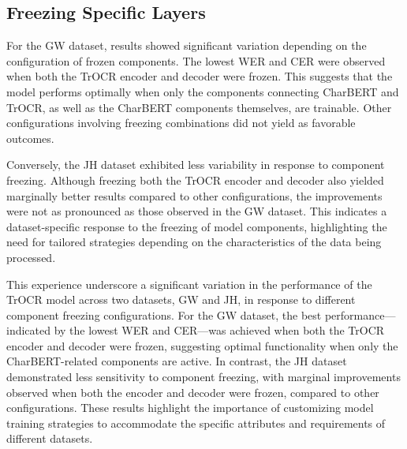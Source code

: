 \subsection{Freezing Specific Layers}
\label{subsec:5_freezing_specific_layers}
For the GW dataset, results showed significant variation depending on the configuration of frozen components. The lowest WER and CER were observed when both the TrOCR encoder and decoder were frozen. This suggests that the model performs optimally when only the components connecting CharBERT and TrOCR, as well as the CharBERT components themselves, are trainable. Other configurations involving freezing combinations did not yield as favorable outcomes.

Conversely, the JH dataset exhibited less variability in response to component freezing. Although freezing both the TrOCR encoder and decoder also yielded marginally better results compared to other configurations, the improvements were not as pronounced as those observed in the GW dataset. This indicates a dataset-specific response to the freezing of model components, highlighting the need for tailored strategies depending on the characteristics of the data being processed.

This experience underscore a significant variation in the performance of the TrOCR model across two datasets, GW and JH, in response to different component freezing configurations. For the GW dataset, the best performance—indicated by the lowest WER and CER—was achieved when both the TrOCR encoder and decoder were frozen, suggesting optimal functionality when only the CharBERT-related components are active. In contrast, the JH dataset demonstrated less sensitivity to component freezing, with marginal improvements observed when both the encoder and decoder were frozen, compared to other configurations. These results highlight the importance of customizing model training strategies to accommodate the specific attributes and requirements of different datasets.


